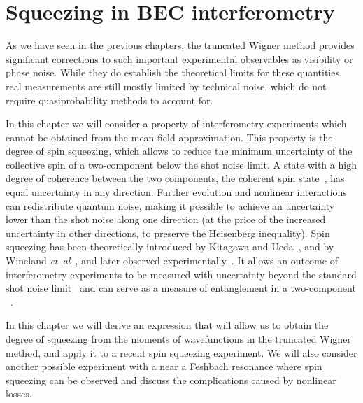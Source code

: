 \chapter{Squeezing in BEC interferometry}
\label{cha:bec-squeezing}

As we have seen in the previous chapters, the truncated Wigner method provides significant corrections to such important experimental observables as visibility or phase noise.
While they do establish the theoretical limits for these quantities, real measurements are still mostly limited by technical noise, which do not require quasiprobability methods to account for.

In this chapter we will consider a property of  interferometry experiments which cannot be obtained from the mean-field approximation.
This property is the degree of spin squeezing, which allows to reduce the minimum uncertainty of the collective spin of a two-component  below the shot noise limit.
A state with a high degree of coherence between the two components, the coherent spin state~\cite{Kitagawa1993}, has equal uncertainty in any direction.
Further evolution and nonlinear interactions can redistribute quantum noise, making it possible to achieve an uncertainty lower than the shot noise along one direction (at the price of the increased uncertainty in other directions, to preserve the Heisenberg inequality).
Spin squeezing has been theoretically introduced by Kitagawa and Ueda~\cite{Kitagawa1993}, and by Wineland \textit{et~al}~\cite{Wineland1994}, and later observed experimentally~\cite{Hald1999,Kuzmich2000}.
It allows an outcome of interferometry experiments to be measured with uncertainty beyond the standard shot noise limit~\cite{Riedel2010,Gross2010} and can serve as a measure of entanglement in a two-component ~\cite{Sorensen2001,He2012-entanglement}.

In this chapter we will derive an expression that will allow us to obtain the degree of squeezing from the moments of wavefunctions in the truncated Wigner method, and apply it to a recent spin squeezing experiment.
We will also consider another possible experiment with a  near a Feshbach resonance where spin squeezing can be observed and discuss the complications caused by nonlinear losses.






